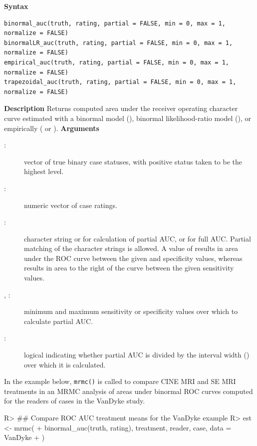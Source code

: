 \documentclass[
]{jss}
\newenvironment{Description}{\textbf{Description}\vspace{0.5em}\newline}{\vspace{0.5em}\newline}
\begin{document}
\begin{tcolorbox}[title=ROC AUC Functions]
\textbf{Syntax}
\begin{footnotesize}
\begin{verbatim}
binormal_auc(truth, rating, partial = FALSE, min = 0, max = 1, normalize = FALSE) 
binormalLR_auc(truth, rating, partial = FALSE, min = 0, max = 1, normalize = FALSE)
empirical_auc(truth, rating, partial = FALSE, min = 0, max = 1, normalize = FALSE) 
trapezoidal_auc(truth, rating, partial = FALSE, min = 0, max = 1, normalize = FALSE)
\end{verbatim}
\end{footnotesize}
\begin{Description}
Returns computed area under the receiver operating character curve estimated with a binormal model (), binormal likelihood-ratio model (), or empirically ( or ).
\end{Description}
\textbf{Arguments}
\begin{description}
\item[:] vector of true binary case statuses, with positive status taken to be the highest level.
\item[:] numeric vector of case ratings.
\item[:] character string  or  for calculation of partial AUC, or  for full AUC.  Partial matching of the character strings is allowed.  A value of  results in area under the ROC curve between the given  and  specificity values, whereas  results in area to the right of the curve between the given sensitivity values.
\item[, :] minimum and maximum sensitivity or specificity values over which to calculate partial AUC.
\item[:] logical indicating whether partial AUC is divided by the interval width () over which it is calculated.
\end{description}
\end{tcolorbox}

In the example below, \texttt{mrmc()} is called to compare CINE MRI and
SE MRI treatments in an MRMC analysis of areas under binormal ROC curves
computed for the readers of cases in the VanDyke study.

\begin{CodeChunk}
\begin{CodeInput}
R> ## Compare ROC AUC treatment means for the VanDyke example
R> est <- mrmc(
+   binormal_auc(truth, rating), treatment, reader, case, data = VanDyke
+ )
\end{CodeInput}
\end{CodeChunk}
\end{document}
